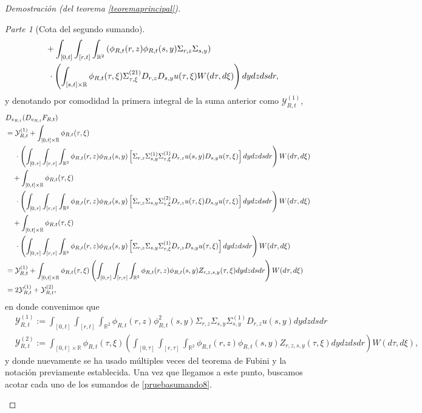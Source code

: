 \documentclass[letterpaper,twoside,12pt]{book}
\newcommand{\R}{\mathbb{R}}
\newcommand{\1}{\mathds{1}}
\theoremstyle{definition}
\theoremstyle{definition}
\theoremstyle{remark}
\newtheorem{proofpart}{Parte}
\theoremstyle{definition}
\theoremstyle{definition}
\theoremstyle{definition}
\theoremstyle{definition}
\theoremstyle{definition}
\begin{document}
\begin{proof}[Demostración (del teorema \ref{teoremaprincipal})]
\begin{proofpart}[Cota del segundo sumando]
\begin{align}
   &\ \ \ +\int_{[0,t]}\int_{[r,t]}\int_{\R^2}\left(\phi_{R,t}(r,z)\phi_{R,t}(s,y)\Sigma_{r,z}\Sigma_{s,y}\right)\notag\\
   &\ \ \ \ \cdot \left(\int_{[s,t]\times\R}\phi_{R,t}(\tau,\xi)\Sigma_{\tau,\xi}^{(21)}D_{r,z}D_{s,y}u(\tau,\xi)W(d\tau,d\xi)\right)dy dz ds dr,\notag
\end{align}
y denotando por comodidad la primera integral de la suma anterior como $\mathcal{Y}_{R,t}^{(1)}$,
\begin{align}
   &D_{v_{R,t}}(D_{v_{R,t}}F_{R,t})\notag\\
   &=\mathcal{Y}_{R,t}^{(1)}+\int_{[0,t]\times\R}\phi_{R,t}(\tau,\xi)\notag\\
   & \ \ \ \ \cdot \left(\int_{[0,\tau]}\int_{[r,\tau]}\int_{\R^2}\phi_{R,t}(r,z)\phi_{R,t}(s,y)\left[\Sigma_{r,z}\Sigma_{s,y}^{(1)}\Sigma_{\tau,\xi}^{(1)}D_{r,z}u(s,y)D_{s,y}u(\tau,\xi)\right]dy dz ds dr\right) W(d\tau,d\xi)\notag\\
   &\ \ \ +\int_{[0,t]\times\R}\phi_{R,t}(\tau,\xi)\notag\\
   &\ \ \ \ \cdot\left(\int_{[0,\tau]}\int_{[r,\tau]}\int_{\R^2}\phi_{R,t}(r,z)\phi_{R,t}(s,y)\left[\Sigma_{r,z}\Sigma_{s,y}\Sigma_{\tau,\xi}^{(2)}D_{r,z}u(\tau,\xi)D_{s,y}u(\tau,\xi)\right]dy dz ds dr\right) W(d\tau,d\xi)\notag\\
   &\ \ \ +\int_{[0,t]\times\R}\phi_{R,t}(\tau,\xi)\notag\\
   &\ \ \ \ \cdot\left(\int_{[0,\tau]}\int_{[r,\tau]}\int_{\R^2}\phi_{R,t}(r,z)\phi_{R,t}(s,y)\left[\Sigma_{r,z}\Sigma_{s,y}\Sigma_{\tau,\xi}^{(1)}D_{r,z}D_{s,y}u(\tau,\xi)\right]dy dz ds dr\right) W(d\tau,d\xi)\notag\\
   &=\mathcal{Y}_{R,t}^{(1)}+\int_{[0,t]\times\R}\phi_{R,t}(\tau,\xi)\left(\int_{[0,\tau]}\int_{[r,\tau]}\int_{\R^2}\phi_{R,t}(r,z)\phi_{R,t}(s,y)Z_{r,z,s,y}(\tau,\xi)dy dz ds dr\right)W(d\tau,d\xi)\notag\\
   &=2\mathcal{Y}_{R,t}^{(1)}+\mathcal{Y}_{R,t}^{(2)},\label{pruebasumando8}
\end{align}
en donde convenimos que
\begin{align*}
   &\mathcal{Y}_{R,t}^{(1)}:=\int_{[0,t]}\int_{[r,t]}\int_{\R^2}\phi_{R,t}(r,z)\phi_{R,t}^2(s,y)\Sigma_{r,z}\Sigma_{s,y}\Sigma^{(1)}_{s,y}D_{r,z}u(s,y)dy dz ds dr\\
   &\mathcal{Y}_{R,t}^{(2)}:=\int_{[0,t]\times\R}\phi_{R,t}(\tau,\xi)\left(\int_{[0,\tau]}\int_{[r,\tau]}\int_{\R^2}\phi_{R,t}(r,z)\phi_{R,t}(s,y)Z_{r,z,s,y}(\tau,\xi)dy dz ds dr\right)W(d\tau,d\xi),
\end{align*}
y donde nuevamente se ha usado múltiples veces del teorema de Fubini y la notación previamente establecida. Una vez que llegamos a este punto, buscamos acotar cada uno de los sumandos de \eqref{pruebasumando8}. 


\end{proofpart}
\end{proof}
\end{document}
